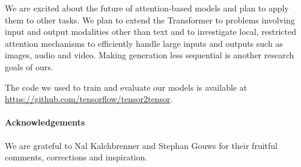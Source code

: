 \documentclass{article}
\begin{document}
We are excited about the future of attention-based models and plan to apply them to other tasks. We plan to extend the Transformer to problems involving input and output modalities other than text and to investigate local, restricted attention mechanisms to efficiently handle large inputs and outputs such as images, audio and video.
Making generation less sequential is another research goals of ours.

The code we used to train and evaluate our models is available at \url{https://github.com/tensorflow/tensor2tensor}.

\paragraph{Acknowledgements} We are grateful to Nal Kalchbrenner and Stephan Gouws for
their fruitful comments, corrections and inspiration.
\end{document}
